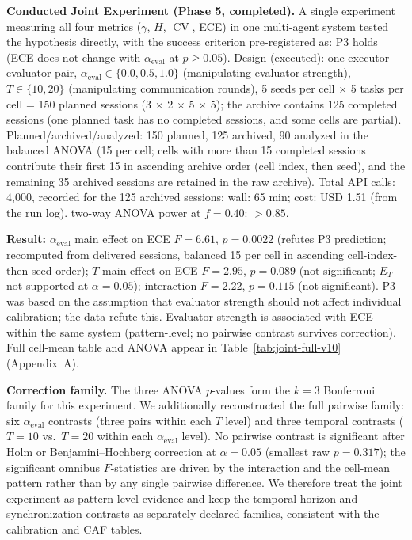 \documentclass[11pt]{article}
\DeclareMathOperator{\CV}{CV}
\begin{document}
\textbf{Conducted Joint Experiment (Phase 5, completed).} A single experiment measuring all four metrics ($\gamma$, $H$, $\CV$, ECE) in one multi-agent system tested the hypothesis directly, with the success criterion pre-registered as: P3 holds (ECE does not change with $\alpha_{\text{eval}}$ at $p \geq 0.05$). Design (executed): one executor--evaluator pair, $\alpha_{\text{eval}} \in \{0.0, 0.5, 1.0\}$ (manipulating evaluator strength), $T \in \{10, 20\}$ (manipulating communication rounds), 5 seeds per cell $\times$ 5 tasks per cell = 150 planned sessions (3 $\times$ 2 $\times$ 5 $\times$ 5); the archive contains 125 completed sessions (one planned task has no completed sessions, and some cells are partial). Planned/archived/analyzed: 150 planned, 125 archived, 90 analyzed in the balanced ANOVA (15 per cell; cells with more than 15 completed sessions contribute their first 15 in ascending archive order (cell index, then seed), and the remaining 35 archived sessions are retained in the raw archive). Total API calls: 4{,}000, recorded for the 125 archived sessions; wall: 65 min; cost: USD 1.51 (from the run log). two-way ANOVA power at $f = 0.40$: $> 0.85$. 

\textbf{Result:} $\alpha_{\text{eval}}$ main effect on ECE $F = 6.61$, $p = 0.0022$ (refutes P3 prediction; recomputed from delivered sessions, balanced 15 per cell in ascending cell-index-then-seed order); $T$ main effect on ECE $F = 2.95$, $p = 0.089$ (not significant; $E_T$ not supported at $\alpha{=}0.05$); interaction $F = 2.22$, $p = 0.115$ (not significant). P3 was based on the assumption that evaluator strength should not affect individual calibration; the data refute this. Evaluator strength is associated with ECE within the same system (pattern-level; no pairwise contrast survives correction). Full cell-mean table and ANOVA appear in Table~\ref{tab:joint-full-v10} (Appendix~A).

\textbf{Correction family.} The three ANOVA $p$-values form the $k{=}3$ Bonferroni family for this experiment. We additionally reconstructed the full pairwise family: six $\alpha_{\text{eval}}$ contrasts (three pairs within each $T$ level) and three temporal contrasts ($T{=}10$ vs.\ $T{=}20$ within each $\alpha_{\text{eval}}$ level). No pairwise contrast is significant after Holm or Benjamini--Hochberg correction at $\alpha{=}0.05$ (smallest raw $p = 0.317$); the significant omnibus $F$-statistics are driven by the interaction and the cell-mean pattern rather than by any single pairwise difference. We therefore treat the joint experiment as pattern-level evidence and keep the temporal-horizon and synchronization contrasts as separately declared families, consistent with the calibration and CAF tables.
\end{document}
